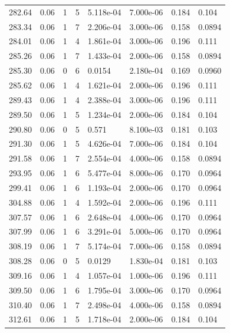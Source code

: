 \documentclass[preview]{standalone}
\begin{document}
{{{\begin{tabular}{L{1.2cm}C{1.2cm} C{0.3cm}C{0.5cm} C{1.4cm}C{1.4cm} C{1.4cm}C{1.4cm}}
  282.64  &  0.06  & 1     &  5 &  5.118e-04  & 7.000e-06  & 0.184 &  0.104   \\ 
  283.34  &  0.06  & 1     &  7 &  2.206e-04  & 3.000e-06  & 0.158 &  0.0894   \\ 
  284.01  &  0.06  & 1     &  4 &  1.861e-04  & 3.000e-06  & 0.196 &  0.111   \\ 
  285.26  &  0.06  & 1     &  7 &  1.433e-04  & 2.000e-06  & 0.158 &  0.0894   \\ 
  285.30  &  0.06  & 0     &  6 &  0.0154  & 2.180e-04  & 0.169 &  0.0960   \\ 
  285.62  &  0.06  & 1     &  4 &  1.621e-04  & 2.000e-06  & 0.196 &  0.111   \\ 
  289.43  &  0.06  & 1     &  4 &  2.388e-04  & 3.000e-06  & 0.196 &  0.111   \\ 
  289.50  &  0.06  & 1     &  5 &  1.234e-04  & 2.000e-06  & 0.184 &  0.104   \\ 
  290.80  &  0.06  & 0     &  5 &  0.571  & 8.100e-03  & 0.181 &  0.103   \\ 
  291.30  &  0.06  & 1     &  5 &  4.626e-04  & 7.000e-06  & 0.184 &  0.104   \\ 
  291.58  &  0.06  & 1     &  7 &  2.554e-04  & 4.000e-06  & 0.158 &  0.0894   \\ 
  293.95  &  0.06  & 1     &  6 &  5.477e-04  & 8.000e-06  & 0.170 &  0.0964   \\ 
  299.41  &  0.06  & 1     &  6 &  1.193e-04  & 2.000e-06  & 0.170 &  0.0964   \\ 
  304.88  &  0.06  & 1     &  4 &  1.592e-04  & 2.000e-06  & 0.196 &  0.111   \\ 
  307.57  &  0.06  & 1     &  6 &  2.648e-04  & 4.000e-06  & 0.170 &  0.0964   \\ 
  307.99  &  0.06  & 1     &  6 &  3.291e-04  & 5.000e-06  & 0.170 &  0.0964   \\ 
  308.19  &  0.06  & 1     &  7 &  5.174e-04  & 7.000e-06  & 0.158 &  0.0894   \\ 
  308.28  &  0.06  & 0     &  5 &  0.0129  & 1.830e-04  & 0.181 &  0.103   \\ 
  309.16  &  0.06  & 1     &  4 &  1.057e-04  & 1.000e-06  & 0.196 &  0.111   \\ 
  309.50  &  0.06  & 1     &  6 &  1.795e-04  & 3.000e-06  & 0.170 &  0.0964   \\ 
  310.40  &  0.06  & 1     &  7 &  2.498e-04  & 4.000e-06  & 0.158 &  0.0894   \\ 
  312.61  &  0.06  & 1     &  5 &  1.718e-04  & 2.000e-06  & 0.184 &  0.104   \\ 

\end{tabular}}}}
\end{document}
